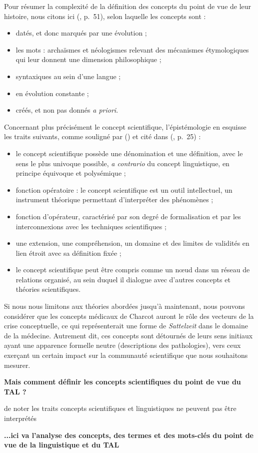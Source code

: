 \begin{description}
Pour résumer la complexité de la définition des concepts du point de vue de leur histoire, nous citons ici \citeauthor{bal2002travelling} (\citeyear{bal2002travelling}, p.~51), selon laquelle les concepts sont :
\begin{itemize}
\item datés, et donc marqués par une évolution ;
\item les mots : archaïsmes et néologismes relevant des mécanismes étymologiques qui leur donnent une dimension philosophique ;
\item syntaxiques au sein d'une langue ;
\item en évolution constante ;
\item créés, et non pas donnés \textit{a priori}.
\end{itemize}
\medskip
Concernant plus précisément le concept scientifique, l'épistémologie en esquisse les traits suivants, comme souligné par \citeauthor{rumelhard1986} (\citeyear{rumelhard1986}) et cité dans \citeauthor{astolfi2008chapitre} (\citeyear{astolfi2008chapitre}, p.~25) :
\begin{itemize}
\item le concept scientifique possède une dénomination et une définition, avec le sens le plus univoque possible, \textit{a contrario} du concept linguistique, en principe équivoque et polysémique ;
\item fonction opératoire : le concept scientifique est un outil intellectuel, un instrument théorique permettant d'interpréter des phénomènes ;
\item fonction d'opérateur, caractérisé par son degré de formalisation et par les interconnexions avec les techniques scientifiques ;
\item une extension, une compréhension, un domaine et des limites de validités en lien étroit avec sa définition fixée ;
\item le concept scientifique peut être compris comme un n\oe{}ud dans un réseau de relations organisé, au sein duquel il dialogue avec d'autres concepts et théories scientifiques.
\end{itemize}

Si nous nous limitons aux théories abordées jusqu'à maintenant, nous pouvons considérer que les concepts médicaux de Charcot auront le rôle des vecteurs de la crise conceptuelle, ce qui représenterait une forme de \textit{Sattelzeit} dans le domaine de la médecine. Autrement dit, ces concepts sont détournés de leurs sens initiaux ayant une apparence formelle neutre (descriptions des pathologies), vers ceux exerçant un certain impact sur la communauté scientifique que nous souhaitons mesurer.

\textbf{Mais comment définir les concepts scientifiques du point de vue du TAL ?}

de noter les traits concepts scientifiques et linguistiques ne peuvent pas être interprétés  



\textbf{...ici va l'analyse des concepts, des termes et des mots-clés du point de vue de la linguistique et du TAL}

\end{description}



